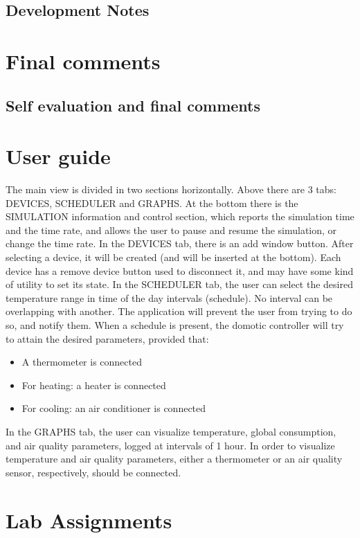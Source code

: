 \documentclass[a4paper,12pt]{report}
\begin{document}



\section{Development Notes}




\chapter{Final comments}

\section{Self evaluation and final comments}




\appendix
\chapter{User guide}

The main view is divided in two sections horizontally. \newline
Above there are 3 tabs: DEVICES, SCHEDULER and GRAPHS. \newline
At the bottom there is the SIMULATION information and control section, which reports the simulation time and the time rate, and allows the user to pause and resume the simulation, or change the time rate. \newline
In the DEVICES tab, there is an add window button. After selecting a device,
it will be created (and will be inserted at the bottom). Each device has a remove device button
used to disconnect it, and may have some kind of utility to set its state. \newline
In the SCHEDULER tab, the user can select the desired temperature range in time of the day intervals (schedule). \newline
No interval can be overlapping with another. The application will prevent the user from trying to do so, and notify them. \newline
When a schedule is present, the domotic controller will try to attain the desired parameters, provided that:
\begin{itemize}
	\item A thermometer is connected
	\item For heating: a heater is connected
	\item For cooling: an air conditioner is connected
\end{itemize}
In the GRAPHS tab, the user can visualize temperature, global consumption, and air quality parameters, logged at intervals of 1 hour. \newline
In order to visualize temperature and air quality parameters, either a thermometer or an air quality sensor, respectively, should be connected.


\chapter{Lab Assignments}





\end{document}
